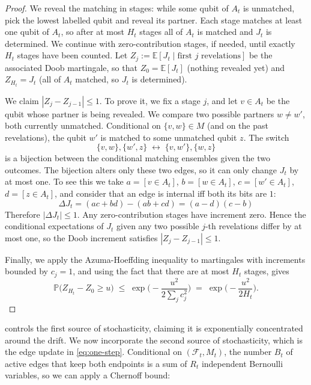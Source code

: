 \documentclass[
    aps,
    superscriptaddress,
    onecolumn,
    10pt,
    prx,
    nofootinbib
]{revtex4-2}
\theoremstyle{namedstatement}
\theoremstyle{plain}
\begin{document}
\begin{proof}
We  reveal the matching in stages: while some qubit of $A_t$ is unmatched, pick the lowest labelled qubit and reveal its partner. Each stage matches at least one qubit of $A_t$, so after at most $H_t$ stages all of $A_t$ is matched and $J_t$ is determined. We continue with zero-contribution stages, if needed, until exactly $H_t$ stages have been counted. Let $Z_j:=\mathbb E[J_t\mid\text{first $j$ revelations}]$ be the associated Doob martingale, so that $Z_0 = \mathbb E[J_t]$ (nothing revealed yet) and $Z_{H_t} = J_t$ (all of $A_t$ matched, so $J_t$ is determined).

We claim $|Z_j-Z_{j-1}|\le 1$. To prove it, we fix a stage $j$, and let $v\in A_t$ be the qubit whose partner is being revealed. We compare two possible partners $w\ne w'$, both currently unmatched. Conditional on $\{v,w\}\in M$ (and on the past revelations), the qubit $w'$ is matched to some unmatched qubit $z$. The switch
\[
  \{v,w\},\{w',z\}\;\longleftrightarrow\;\{v,w'\},\{w,z\}
\]
is a bijection between the conditional matching ensembles given the two outcomes. The bijection alters only these two edges, so it can only change $J_t$ by at most one. To see this we take $a=[v \in A_t]$, $b=[w \in A_t]$, $c=[w'\in A_t]$, $d=[z \in A_t]$, and consider that an edge is internal iff both its bits are $1$:
\begin{equation}
    \Delta J_t=(ac+bd)-(ab+cd)=(a-d)(c-b)
\end{equation}
Therefore $|\Delta J_t|\leq 1$. Any zero-contribution stages have increment zero. Hence the
conditional expectations of $J_t$ given any two possible $j$-th revelations differ by at
most one, so the Doob increment satisfies $|Z_j-Z_{j-1}| \leq 1$.

Finally, we apply the Azuma-Hoeffding inequality to martingales with increments bounded by $c_j=1$, and using the fact that there are at most $H_t$ stages, gives
\begin{equation}
  \mathbb P\big(Z_{H_t} - Z_0 \ge u\big)
  \;\le\; \exp\!\Big(-\frac{u^2}{2\sum_j c_j^2}\Big)
  \;=\; \exp\!\Big(-\frac{u^2}{2H_t}\Big).
\end{equation}
\end{proof}
 controls the first source of stochasticity, claiming it is exponentially concentrated around the drift. We now incorporate the second source of stochasticity, which is the edge update in \cref{eq:one-step}. Conditional on $(\mathcal F_t, M_t)$, the number $B_t$ of
active edges that keep both endpoints is a sum of $R_t$ independent Bernoulli
variables, so we can apply a Chernoff bound:
\end{document}
